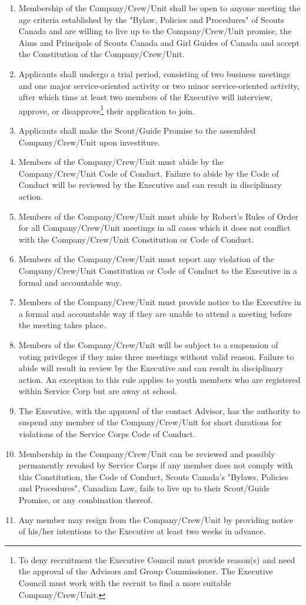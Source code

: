 \begin{enumerate}
	\item Membership of the Company/Crew/Unit shall be open to anyone meeting the age criteria established by the "Bylaw, Policies and Procedures" of Scouts Canada and are willing to live up to the Company/Crew/Unit promise, the Aims and Principals of Scouts Canada and Girl Guides of Canada and accept the Constitution of the Company/Crew/Unit. 
	\item Applicants shall undergo a trial period, consisting of two business meetings and one major service-oriented activity or two minor service-oriented activity, after which time at least two members of the Executive will interview, approve, or disapprove\footnote{To deny recruitment the Executive Council must provide reason(s) and need the approval of the Advisors and Group Commissioner. The Executive Council must work with the recruit to find a more suitable Company/Crew/Unit.} their application to join.
	\item Applicants shall make the Scout/Guide Promise to the assembled Company/Crew/Unit upon investiture. 
	\item Members of the Company/Crew/Unit must abide by the Company/Crew/Unit Code of Conduct. Failure to abide by the Code of Conduct will be reviewed by the Executive and can result in disciplinary action. 
	\item Members of the Company/Crew/Unit must abide by Robert's Rules of Order for all Company/Crew/Unit meetings in all cases which it does not conflict with the Company/Crew/Unit Constitution or Code of Conduct.
	\item Members of the Company/Crew/Unit must report any violation of the Company/Crew/Unit Constitution or Code of Conduct to the Executive in a formal and accountable way.
	\item Members of the Company/Crew/Unit must provide notice to the Executive in a formal and accountable way if they are unable to attend a meeting before the meeting takes place.
	\item Members of the Company/Crew/Unit will be subject to a suspension of voting privileges if they miss three meetings without valid reason. Failure to abide will result in review by the Executive and can result in disciplinary action. An exception to this rule applies to youth members who are registered within Service Corp but are away at school.
	\item The Executive, with the approval of the contact Advisor, has the authority to suspend any member of the Company/Crew/Unit for short durations for violations of the Service Corps Code of Conduct. 
	\item Membership in the Company/Crew/Unit can be reviewed and possibly permanently revoked by Service Corps if any member does not comply with this Constitution, the Code of Conduct, Scouts Canada's "Bylaws, Policies and Procedures", Canadian Law, fails to live up to their Scout/Guide Promise, or any combination thereof.
	\item Any member may resign from the Company/Crew/Unit by providing notice of his/her intentions to the Executive at least two weeks in advance.
\end{enumerate}
